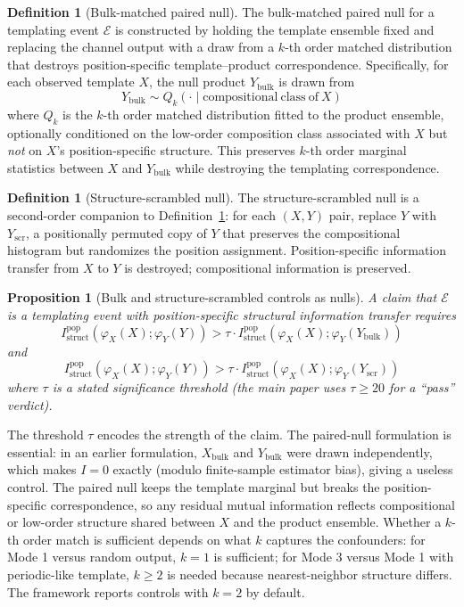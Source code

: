 \documentclass[11pt]{article}
\theoremstyle{plain}
\newtheorem{proposition}[theorem]{Proposition}
\theoremstyle{definition}
\newtheorem{definition}[theorem]{Definition}
\newcommand{\Istructpop}{I_{\mathrm{struct}}^{\mathrm{pop}}}
\newcommand{\descX}{\varphi_X}
\newcommand{\descY}{\varphi_Y}
\begin{document}
\begin{definition}[Bulk-matched paired null]
\label{def:bulk_null}
The bulk-matched paired null for a templating event $\mathcal{E}$ is constructed by holding the template ensemble fixed and replacing the channel output with a draw from a $k$-th order matched distribution that destroys position-specific template--product correspondence. Specifically, for each observed template $X$, the null product $Y_{\mathrm{bulk}}$ is drawn from
\[
Y_{\mathrm{bulk}} \sim Q_k\!\left(\cdot \mid \mathrm{compositional\ class\ of\ } X\right)
\]
where $Q_k$ is the $k$-th order matched distribution fitted to the product ensemble, optionally conditioned on the low-order composition class associated with $X$ but \emph{not} on $X$'s position-specific structure. This preserves $k$-th order marginal statistics between $X$ and $Y_{\mathrm{bulk}}$ while destroying the templating correspondence.
\end{definition}

\begin{definition}[Structure-scrambled null]
\label{def:structure_scrambled}
The structure-scrambled null is a second-order companion to Definition~\ref{def:bulk_null}: for each $(X, Y)$ pair, replace $Y$ with $Y_{\mathrm{scr}}$, a positionally permuted copy of $Y$ that preserves the compositional histogram but randomizes the position assignment. Position-specific information transfer from $X$ to $Y$ is destroyed; compositional information is preserved.
\end{definition}

\begin{proposition}[Bulk and structure-scrambled controls as nulls]
\label{prop:bulk_null}
A claim that $\mathcal{E}$ is a templating event with position-specific structural information transfer requires
\[
\Istructpop(\descX(X); \descY(Y)) > \tau \cdot \Istructpop(\descX(X); \descY(Y_{\mathrm{bulk}}))
\]
and
\[
\Istructpop(\descX(X); \descY(Y)) > \tau \cdot \Istructpop(\descX(X); \descY(Y_{\mathrm{scr}}))
\]
where $\tau$ is a stated significance threshold (the main paper uses $\tau \ge 20$ for a ``pass'' verdict).
\end{proposition}

The threshold $\tau$ encodes the strength of the claim. The paired-null formulation is essential: in an earlier formulation, $X_{\mathrm{bulk}}$ and $Y_{\mathrm{bulk}}$ were drawn independently, which makes $I = 0$ exactly (modulo finite-sample estimator bias), giving a useless control. The paired null keeps the template marginal but breaks the position-specific correspondence, so any residual mutual information reflects compositional or low-order structure shared between $X$ and the product ensemble. Whether a $k$-th order match is sufficient depends on what $k$ captures the confounders: for Mode 1 versus random output, $k = 1$ is sufficient; for Mode 3 versus Mode 1 with periodic-like template, $k \ge 2$ is needed because nearest-neighbor structure differs. The framework reports controls with $k = 2$ by default.
\end{document}
